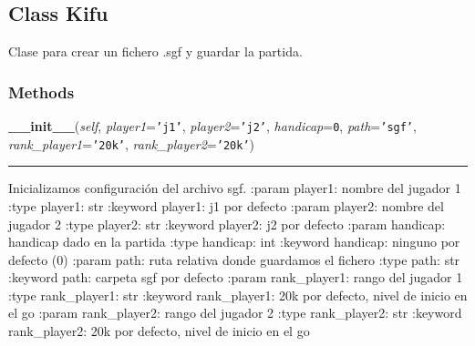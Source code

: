 \subsection{Class Kifu}

    \label{src:kifu:Kifu}

Clase para crear un fichero .sgf y guardar la partida.


  \subsubsection{Methods}

    \label{src:kifu:Kifu:__init__}

    \vspace{0.5ex}

\hspace{.8\funcindent}\begin{boxedminipage}{\funcwidth}

    \raggedright \textbf{\_\_init\_\_}(\textit{self}, \textit{player1}={\tt \texttt{'}\texttt{j1}\texttt{'}}, \textit{player2}={\tt \texttt{'}\texttt{j2}\texttt{'}}, \textit{handicap}={\tt 0}, \textit{path}={\tt \texttt{'}\texttt{sgf}\texttt{'}}, \textit{rank\_player1}={\tt \texttt{'}\texttt{20k}\texttt{'}}, \textit{rank\_player2}={\tt \texttt{'}\texttt{20k}\texttt{'}})

    \vspace{-1.5ex}

    \rule{\textwidth}{0.5\fboxrule}
\setlength{\parskip}{2ex}

Inicializamos configuración del archivo sgf.
:param  player1: nombre del jugador 1
:type  player1: str
:keyword  player1: j1 por defecto
:param  player2: nombre del jugador 2
:type  player2: str
:keyword  player2: j2 por defecto
:param  handicap: handicap dado en la partida
:type  handicap: int
:keyword  handicap: ninguno por defecto (0)
:param  path: ruta relativa donde guardamos el fichero
:type  path: str
:keyword  path: carpeta sgf por defecto
:param  rank\_player1: rango del jugador 1
:type  rank\_player1: str
:keyword  rank\_player1: 20k por defecto, nivel de inicio en el go
:param  rank\_player2: rango del jugador 2
:type  rank\_player2: str
:keyword  rank\_player2: 20k por defecto, nivel de inicio en el go
\setlength{\parskip}{1ex}
    \end{boxedminipage}

